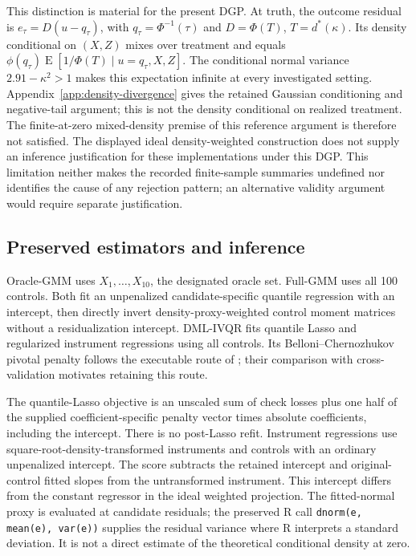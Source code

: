 This distinction is material for the present DGP. At truth, the outcome residual is $e_\tau=D(u-q_\tau)$, with $q_\tau=\Phi^{-1}(\tau)$ and $D=\Phi(T)$, $T=d^*(\kappa)$. Its density conditional on $(X,Z)$ mixes over treatment and equals $\phi(q_\tau)\operatorname E[1/\Phi(T)\mid u=q_\tau,X,Z]$. The conditional normal variance $2.91-\kappa^2>1$ makes this expectation infinite at every investigated setting. Appendix~\ref{app:density-divergence} gives the retained Gaussian conditioning and negative-tail argument; this is not the density conditional on realized treatment. The finite-at-zero mixed-density premise of this reference argument is therefore not satisfied. The displayed ideal density-weighted construction does not supply an inference justification for these implementations under this DGP. This limitation neither makes the recorded finite-sample summaries undefined nor identifies the cause of any rejection pattern; an alternative validity argument would require separate justification.

\subsection{Preserved estimators and inference}
\label{sec:implementation}
Oracle-GMM uses $X_1,\ldots,X_{10}$, the designated oracle set. Full-GMM uses all 100 controls. Both fit an unpenalized candidate-specific quantile regression with an intercept, then directly invert density-proxy-weighted control moment matrices without a residualization intercept. DML-IVQR fits quantile Lasso and regularized instrument regressions using all controls. Its Belloni--Chernozhukov pivotal penalty follows the executable route of \textcite{chen_huang_tien_2021}; their comparison with cross-validation motivates retaining this route.

The quantile-Lasso objective is an unscaled sum of check losses plus one half of the supplied coefficient-specific penalty vector times absolute coefficients, including the intercept. There is no post-Lasso refit. Instrument regressions use square-root-density-transformed instruments and controls with an ordinary unpenalized intercept. The score subtracts the retained intercept and original-control fitted slopes from the untransformed instrument. This intercept differs from the constant regressor in the ideal weighted projection. The fitted-normal proxy is evaluated at candidate residuals; the preserved R call \texttt{dnorm(e, mean(e), var(e))} supplies the residual variance where R interprets a standard deviation. It is not a direct estimate of the theoretical conditional density at zero.

